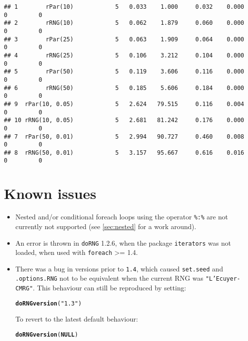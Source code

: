 \documentclass[a4paper,12pt]{article}\usepackage[]{graphicx}\usepackage[]{color}
\makeatletter
\newcommand{\hlstr}[1]{\textcolor[rgb]{0.192,0.494,0.8}{#1}}%
\newcommand{\hlstd}[1]{\textcolor[rgb]{0.345,0.345,0.345}{#1}}%
\newcommand{\hlkwa}[1]{\textcolor[rgb]{0.161,0.373,0.58}{\textbf{#1}}}%
\newcommand{\hlkwd}[1]{\textcolor[rgb]{0.737,0.353,0.396}{\textbf{#1}}}%
\newenvironment{kframe}{%
 \def\at@end@of@kframe{}%
 \ifinner\ifhmode%
  \def\at@end@of@kframe{\end{minipage}}%
  \begin{minipage}{\columnwidth}%
 \fi\fi%
 \def\FrameCommand##1{\hskip\@totalleftmargin \hskip-\fboxsep
 \colorbox{shadecolor}{##1}\hskip-\fboxsep
     \hskip-\linewidth \hskip-\@totalleftmargin \hskip\columnwidth}%
 \MakeFramed {\advance\hsize-\width
   \@totalleftmargin\z@ \linewidth\hsize
   \@setminipage}}%
 {\par\unskip\endMakeFramed%
 \at@end@of@kframe}
\newenvironment{knitrout}{}{} %
\let\code=\texttt
\makeatother
\begin{document}
\begin{knitrout}
\begin{kframe}
\begin{verbatim}
## 1        rPar(10)            5   0.033    1.000     0.032    0.000          0         0
## 2        rRNG(10)            5   0.062    1.879     0.060    0.000          0         0
## 3        rPar(25)            5   0.063    1.909     0.064    0.000          0         0
## 4        rRNG(25)            5   0.106    3.212     0.104    0.000          0         0
## 5        rPar(50)            5   0.119    3.606     0.116    0.000          0         0
## 6        rRNG(50)            5   0.185    5.606     0.184    0.000          0         0
## 9  rPar(10, 0.05)            5   2.624   79.515     0.116    0.004          0         0
## 10 rRNG(10, 0.05)            5   2.681   81.242     0.176    0.000          0         0
## 7  rPar(50, 0.01)            5   2.994   90.727     0.460    0.008          0         0
## 8  rRNG(50, 0.01)            5   3.157   95.667     0.616    0.016          0         0
\end{verbatim}
\end{kframe}
\end{knitrout}


\section{Known issues}
\label{sec:issues}

\begin{itemize}
\item Nested and/or conditional foreach loops using the operator \code{\%:\%} are not 
currently not supported (see \cref{sec:nested} for a work around).
\item An error is thrown in \code{doRNG} 1.2.6, when the package \code{iterators} was not loaded, when used with 
\code{foreach} >= 1.4.
\item There was a bug in versions prior to \code{1.4}, which caused \code{set.seed} and 
\code{.options.RNG} not to be equivalent when the current RNG was \code{"L'Ecuyer-CMRG"}.
This behaviour can still be reproduced by setting:
\begin{knitrout}\footnotesize
{}\color{fgcolor}\begin{kframe}
\begin{alltt}
\hlkwd{doRNGversion}\hlstd{(}\hlstr{"1.3"}\hlstd{)}
\end{alltt}
\end{kframe}
\end{knitrout}

To revert to the latest default behaviour:
\begin{knitrout}\footnotesize
{}\color{fgcolor}\begin{kframe}
\begin{alltt}
\hlkwd{doRNGversion}\hlstd{(}\hlkwa{NULL}\hlstd{)}
\end{alltt}
\end{kframe}
\end{knitrout}

\end{itemize} 
\end{document}

